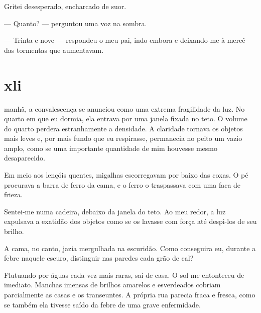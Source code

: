 
Gritei desesperado, encharcado de suor.

--- Quanto? --- perguntou uma voz na sombra.

--- Trinta e nove --- respondeu o meu pai, indo embora e deixando-me à mercê
    das tormentas que aumentavam.


\section{xli} 

 manhã, a convalescença se anunciou como uma extrema fragilidade
 da luz. No quarto em que eu dormia, ela entrava por uma janela fixada no
 teto. O volume do quarto perdera estranhamente a densidade. A claridade
 tornava os objetos mais leves e, por mais fundo que eu respirasse,
 permanecia no peito um vazio amplo, como se uma importante quantidade de mim
 houvesse mesmo desaparecido.

Em meio aos lençóis quentes, migalhas escorregavam por baixo das coxas. O pé
procurava a barra de ferro da cama, e o ferro o traspassava com uma faca de
frieza.


Sentei-me numa cadeira, debaixo da janela do teto. Ao meu redor, a luz
expulsava a exatidão dos objetos como se os lavasse com força até despi-los
de seu brilho.

A cama, no canto, jazia mergulhada na escuridão. Como conseguira eu, durante a
febre naquele escuro, distinguir nas paredes cada grão de cal?


Flutuando por águas cada vez mais raras, saí de casa. O sol me entonteceu de
imediato. Manchas imensas de brilhos amarelos e esverdeados cobriam
parcialmente as casas e os transeuntes. A própria rua parecia fraca e fresca,
como se também ela tivesse saído da febre de uma grave enfermidade.

